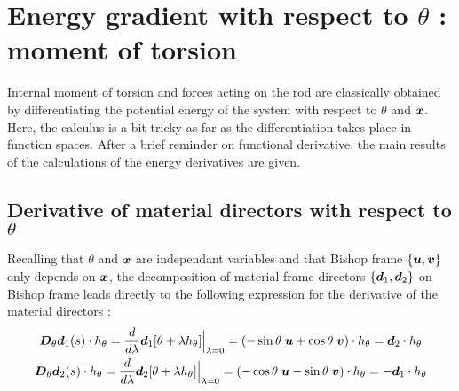 \section{Energy gradient with respect to $\theta$ : moment of torsion}
Internal moment of torsion and forces acting on the rod are classically obtained by differentiating the potential energy of the system with respect to $\theta$ and $\boldsymbol{x}$. Here, the calculus is a bit tricky as far as the differentiation takes place in function spaces. After a brief reminder on functional derivative, the main results of the calculations of the energy derivatives are given.

\subsection{Derivative of material directors with respect to $\theta$}

Recalling that $\theta$ and $\boldsymbol{x}$ are independant variables and that Bishop frame $\{\boldsymbol{u},\boldsymbol{v}\}$ only depends on $\boldsymbol{x}$, the decomposition of material frame directors $\{\boldsymbol{d}_1,\boldsymbol{d}_2\}$ on Bishop frame leads directly to the following expression for the derivative of the material directors  :
\begin{subequations}
	\begin{gather}
	\boldsymbol{D}_\theta\boldsymbol{d}_1(s)\cdot h_\theta
	= \frac{d}{d\lambda} \boldsymbol{d}_1[\theta + \lambda h_\theta]\Bigr|_{\lambda = 0}
	= \left(-\sin{\theta}\;\boldsymbol{u} + \cos{\theta}\;\boldsymbol{v}\right) \cdot h_\theta
	= \boldsymbol{d}_2\cdot h_\theta \\
	\boldsymbol{D}_\theta\boldsymbol{d}_2(s)\cdot h_\theta
	= \frac{d}{d\lambda} \boldsymbol{d}_2[\theta + \lambda h_\theta]\Bigr|_{\lambda = 0}
	= \left(-\cos{\theta}\;\boldsymbol{u} - \sin{\theta}\;\boldsymbol{v}\right) \cdot h_\theta
	= -\boldsymbol{d}_1\cdot h_\theta
	\end{gather}
\end{subequations}

